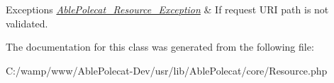\begin{DoxyExceptions}{Exceptions}
{\em \hyperlink{class_able_polecat___resource___exception}{Able\+Polecat\+\_\+\+Resource\+\_\+\+Exception}} & If request U\+R\+I path is not validated. \\
\hline
\end{DoxyExceptions}


The documentation for this class was generated from the following file\+:\begin{DoxyCompactItemize}
\item 
C\+:/wamp/www/\+Able\+Polecat-\/\+Dev/usr/lib/\+Able\+Polecat/core/Resource.\+php\end{DoxyCompactItemize}
